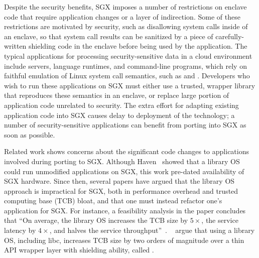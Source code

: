 Despite the security benefits,
SGX imposes a number of restrictions on enclave code 
that require application changes
or a layer of indirection. %
Some of these restrictions are motivated by security, such as disallowing system calls
inside of an enclave, so that system call results can be sanitized by a piece of carefully-written shielding code in the enclave before being used by the application.
The typical applications
for processing security-sensitive data
in a cloud environment
include servers, language runtimes, and
command-line programs,
which rely on faithful emulation of Linux system call semantics, such as  and .
Developers who wish to run these applications on SGX
must either use 
a trusted, wrapper library that reproduces these semantics in an enclave, or replace large portion of application code
unrelated to security.
The extra effort for adapting existing application code
into SGX causes delay to deployment of the technology; a number of  security-sensitive applications
can benefit from porting into SGX as soon as possible.






Related work shows concerns about the significant code changes to applications involved during porting to SGX.
Although Haven~\cite{baumann14haven} showed that a library OS
could run unmodified applications on SGX, this work pre-dated availability of SGX hardware.
Since then, several papers have argued that the library OS approach is impractical for SGX,
both in performance overhead and trusted computing base (TCB) bloat, and that one must instead refactor one's application for SGX.
For instance, a feasibility analysis in the \scone{} paper
concludes that ``On average, the library OS increases the TCB size by $5\times$, the service latency by $4\times$,
and halves the service throughput''~\cite{osdi16scone}.
~\citet{shinde17panoply} argue that using a library OS, including libc, increases TCB size by two orders of magnitude over
a thin API wrapper layer with shielding ability, called \panoply{}.




